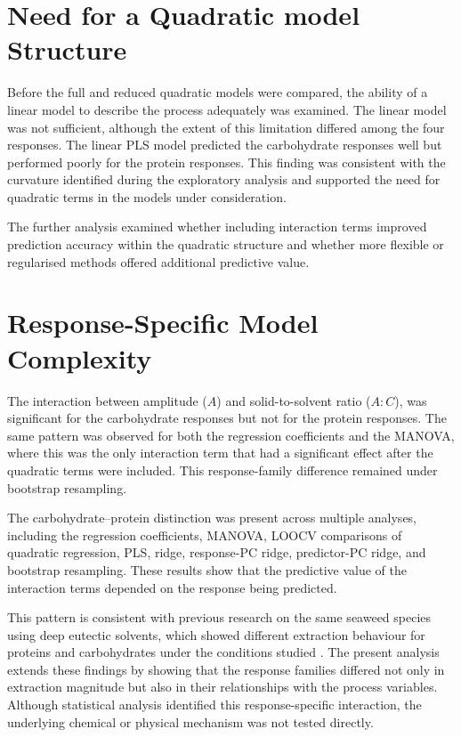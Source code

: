 \documentclass[MScDSA]{uccthesis}
\begin{document}
\section{Need for a Quadratic model Structure}
Before the full and reduced quadratic models were compared, the ability of a linear model to describe the process adequately was examined. The linear model was not sufficient, although the extent of this limitation differed among the four responses. The linear PLS model predicted the carbohydrate responses well but performed poorly for the protein responses. This finding was consistent with the curvature identified during the exploratory analysis and supported the need for quadratic terms in the models under consideration.

The further analysis examined whether including interaction terms improved prediction accuracy within the quadratic structure and whether more flexible or regularised methods offered additional predictive value.


\section{Response-Specific Model Complexity}
The interaction between amplitude ($A$) and solid-to-solvent ratio ($A:C$), was significant for the carbohydrate responses but not for the protein responses. The same pattern was observed for both the regression coefficients and the MANOVA, where this was the only interaction term that had a significant effect after the quadratic terms were included. This response-family difference remained under bootstrap resampling.

The carbohydrate--protein distinction was present across multiple analyses, including the regression coefficients, MANOVA, LOOCV comparisons of quadratic regression, PLS, ridge, response-PC ridge, predictor-PC ridge, and bootstrap resampling. These results show that the predictive value of the interaction terms depended on the response being predicted.

This pattern is consistent with previous research on the same seaweed species using deep eutectic solvents, which showed different extraction behaviour for proteins and carbohydrates under the conditions studied \parencite{Moldes:2024}. The present analysis extends these findings by showing that the response families differed not only in extraction magnitude but also in their relationships with the process variables. Although statistical analysis identified this response-specific interaction, the underlying chemical or physical mechanism was not tested directly.
\end{document}
